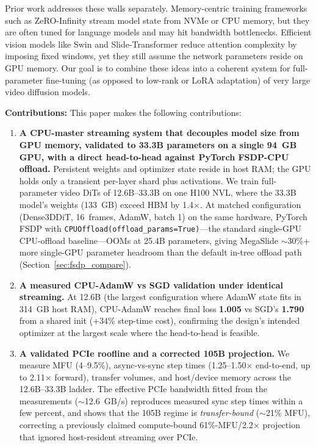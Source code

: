 \documentclass[11pt, letterpaper]{article}
\begin{document}
Prior work addresses these walls separately. Memory-centric training frameworks such as ZeRO-Infinity stream model state from NVMe or CPU memory, but they are often tuned for language models and may hit bandwidth bottlenecks. Efficient vision models like Swin and Slide-Transformer reduce attention complexity by imposing fixed windows, yet they still assume the network parameters reside on GPU memory. Our goal is to combine these ideas into a coherent system for full-parameter fine-tuning (as opposed to low-rank or LoRA adaptation) of very large video diffusion models.

\textbf{Contributions:} This paper makes the following contributions:
\begin{enumerate}
    \item \textbf{A CPU-master streaming system that decouples model size from GPU memory, validated to 33.3B parameters on a single 94~GB GPU, with a direct head-to-head against PyTorch FSDP-CPU offload.} Persistent weights and optimizer state reside in host RAM; the GPU holds only a transient per-layer shard plus activations. We train full-parameter video DiTs of 12.6B--33.3B on one H100 NVL, where the 33.3B model's weights (133~GB) exceed HBM by 1.4$\times$. At matched configuration (Dense3DDiT, 16~frames, AdamW, batch 1) on the same hardware, PyTorch FSDP with \texttt{CPUOffload(offload\_params=True)}---the standard single-GPU CPU-offload baseline---OOMs at 25.4B parameters, giving MegaSlide $\sim$30\%+ more single-GPU parameter headroom than the default in-tree offload path (Section~\ref{sec:fsdp_compare}).
    \item \textbf{A measured CPU-AdamW vs SGD validation under identical streaming.} At 12.6B (the largest configuration where AdamW state fits in 314~GB host RAM), CPU-AdamW reaches final loss \textbf{1.005} vs SGD's \textbf{1.790} from a shared init (+34\% step-time cost), confirming the design's intended optimizer at the largest scale where the head-to-head is feasible.
    \item \textbf{A validated PCIe roofline and a corrected 105B projection.} We measure MFU (4--9.5\%), async-vs-sync step times (1.25--1.50$\times$ end-to-end, up to 2.11$\times$ forward), transfer volumes, and host/device memory across the 12.6B--33.3B ladder. The effective PCIe bandwidth fitted from the measurements ($\sim$12.6~GB/s) reproduces measured sync step times within a few percent, and shows that the 105B regime is \emph{transfer-bound} ($\sim$21\% MFU), correcting a previously claimed compute-bound 61\%-MFU/2.2$\times$ projection that ignored host-resident streaming over PCIe.

\end{enumerate}
\end{document}
